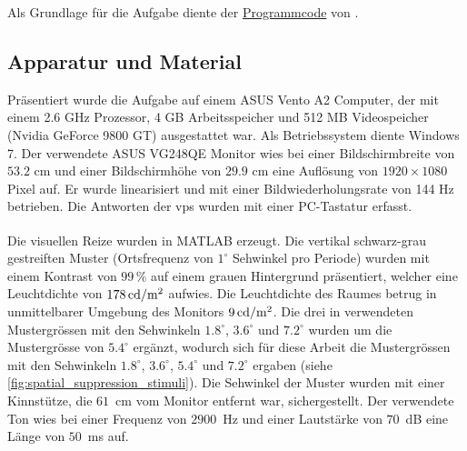 \documentclass[11pt, twoside, a4paper]{book}		%
\begin{document}
Als Grundlage für die Aufgabe diente der \href{http://www.bcs.rochester.edu/people/duje/SuppressionCode.zip}{Programmcode} von \citet{Melnick2013}.

\subsection{Apparatur und Material \label{sub:ssas}}
Präsentiert wurde die Aufgabe auf einem ASUS Vento A2 Computer, der mit einem 2.6 GHz Prozessor, 4 GB Arbeitsspeicher und 512 MB Videospeicher (Nvidia GeForce 9800 GT) ausgestattet war. Als Betriebssystem diente Windows 7. Der verwendete ASUS VG248QE Monitor wies bei einer Bildschirmbreite von $53.2$ cm und einer Bildschirmhöhe von $29.9$ cm eine Auflösung von $1920 \times 1080$ Pixel auf. Er wurde linearisiert und mit einer Bildwiederholungsrate von 144 Hz betrieben. Die Antworten der \glspl{vp} wurden mit einer PC-Tastatur erfasst. 

Die visuellen Reize wurden in MATLAB\textsuperscript{\textregistered} \citep{matlab} erzeugt. Die vertikal schwarz-grau gestreiften Muster (Ortsfrequenz von $1^{\circ}$ Sehwinkel pro Periode) wurden mit einem Kontrast von $99\,\%$ auf einem grauen Hintergrund präsentiert, welcher eine Leuchtdichte von $178\,\textnormal{cd}/ \textnormal{m}^2$ aufwies. Die Leuchtdichte des Raumes betrug in unmittelbarer Umgebung des Monitors $9\,\textnormal{cd}/ \textnormal{m}^2$. Die drei in \citet{Melnick2013} verwendeten Mustergrössen mit den Sehwinkeln  $1.8^{\circ}$, $3.6^{\circ}$ und $7.2^{\circ}$ wurden um die Mustergrösse von $5.4^{\circ}$ ergänzt, wodurch sich für diese Arbeit die Mustergrössen mit den Sehwinkeln $1.8^{\circ}$, $3.6^{\circ}$, $5.4^{\circ}$ und $7.2^{\circ}$ ergaben (siehe \autoref{fig:spatial_suppression_stimuli}). 
Die Sehwinkel der Muster wurden mit einer Kinnstütze, die $61$~cm vom Monitor entfernt war, sichergestellt. 
Der verwendete Ton wies bei einer Frequenz von $2900$~Hz und einer Lautstärke von $70$~dB eine Länge von $50$~ms auf.

%
%
\end{document}
